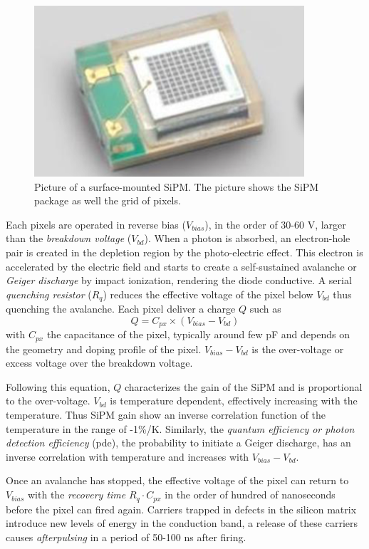 \begin{figure}[htbp!]
  \centering
  \includegraphics[width=0.4\linewidth]{chap3/fig/SMD_SiPM.png}
  \caption{Picture of a surface-mounted SiPM. The picture shows the SiPM package as well the grid of pixels.} \label{fig:SMD_SiPM}
\end{figure}

Each pixels are operated in reverse bias ($V_{bias}$), in the order of 30-60 V, larger than the \textit{breakdown voltage} ($V_{bd}$). When a photon is absorbed, an electron-hole pair is created in the depletion region by the photo-electric effect. This electron is accelerated by the electric field and starts to create a self-sustained avalanche or \textit{Geiger discharge} by impact ionization, rendering the diode conductive. A serial \textit{quenching resistor} ($R_q$) reduces the effective voltage of the pixel below $V_{bd}$ thus quenching the avalanche. Each pixel deliver a charge $Q$ such as
\begin{equation}
  Q = C_{px} \times (V_{bias} - V_{bd})
\end{equation}
with $C_{px}$ the capacitance of the pixel, typically around few pF and depends on the geometry and doping profile of the pixel. $V_{bias} - V_{bd}$ is the over-voltage or excess voltage over the breakdown voltage.

Following this equation, $Q$ characterizes the gain of the SiPM and is proportional to the over-voltage. $V_{bd}$ is temperature dependent, effectively increasing with the temperature. Thus SiPM gain show an inverse correlation function of the temperature in the range of -1\%/K. Similarly, the \textit{quantum efficiency or photon detection efficiency} (\acrshort{pde}), the probability to initiate a Geiger discharge, has an inverse correlation with temperature and increases with $V_{bias} - V_{bd}$.

Once an avalanche has stopped, the effective voltage of the pixel can return to $V_{bias}$ with the \textit{recovery time} $R_q \cdot C_{px}$ in the order of hundred of nanoseconds before the pixel can fired again. Carriers trapped in defects in the silicon matrix introduce new levels of energy in the conduction band, a release of these carriers causes \textit{afterpulsing} in a period of 50-100 ns after firing.

